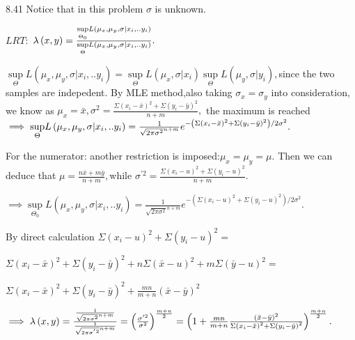 \documentclass{article}
\begin{document}
8.41 Notice that in this problem $\sigma $ is unknown.

$LRT:$ $\lambda \left( x,y\right) =\frac{\underset{\Theta _{0}}{\sup }%
L\left( \mu _{x},\mu _{y},\sigma |x_{i},..y_{i}\right) }{\underset{\Theta }{%
\sup }L\left( \mu _{x},\mu _{y},\sigma |x_{i},..y_{i}\right) }.$

$\underset{\Theta }{\sup }L\left( \mu _{x},\mu _{y},\sigma
|x_{i},..y_{i}\right) =\underset{\Theta }{\sup }L\left( \mu _{x},\sigma
|x_{i}\right) \underset{\Theta }{\sup }L\left( \mu _{y},\sigma |y_{i}\right)
,$since the two samples are indepedent. By MLE method,also taking $\sigma
_{x}=\sigma _{y}$ into consideration, we know as $\mu _{x}=\bar{x},\sigma
^{2}=\frac{\Sigma \left( x_{i}-\bar{x}\right) ^{2}+\Sigma \left( y_{i}-\bar{y%
}\right) ^{2}}{n+m},$ the maximum is reached$\implies \underset{\Theta }{%
\sup }L\left( \mu _{x},\mu _{y},\sigma |x_{i},..y_{i}\right) =\frac{1}{\sqrt{%
2\pi \sigma ^{2}}^{n+m}}e^{-\left( \Sigma \left( x_{i}-\bar{x}\right)
^{2}+\Sigma \left( y_{i}-\bar{y}\right) ^{2}\right) /2\sigma ^{2}}.$

For the numerator: another restriction is imposed:$\mu _{x}=\mu _{y}=\mu .$
Then we can deduce that $\mu =\frac{n\bar{x}+m\bar{y}}{n+m},$while $\sigma
^{\prime 2}=\frac{\Sigma \left( x_{i}-u\right) ^{2}+\Sigma \left(
y_{i}-u\right) ^{2}}{n+m}.$

$\implies \underset{\Theta _{0}}{\sup }L\left( \mu _{x},\mu _{y},\sigma
|x_{i},..y_{i}\right) =\frac{1}{\sqrt{2\pi \sigma ^{2}}^{n+m}}e^{-\left(
\Sigma \left( x_{i}-u\right) ^{2}+\Sigma \left( y_{i}-u\right) ^{2}\right)
/2\sigma ^{2}}.$

By direct calculation $\Sigma \left( x_{i}-u\right) ^{2}+\Sigma \left(
y_{i}-u\right) ^{2}=$

$\Sigma \left( x_{i}-\bar{x}\right) ^{2}+\Sigma \left( y_{i}-\bar{y}\right)
^{2}+n\Sigma \left( \bar{x}-u\right) ^{2}+m\Sigma \left( \bar{y}-u\right)
^{2}=$

$\Sigma \left( x_{i}-\bar{x}\right) ^{2}+\Sigma \left( y_{i}-\bar{y}\right)
^{2}+\frac{mn}{m+n}\left( \bar{x}-\bar{y}\right) ^{2}$

$\implies \lambda \left( x,y\right) =\frac{\frac{1}{\sqrt{2\pi \sigma ^{2}}%
^{n+m}}}{\frac{1}{\sqrt{2\pi \sigma ^{^{\prime }2}}^{n+m}}}=\left( \frac{%
\sigma ^{\prime 2}}{\sigma ^{2}}\right) ^{\frac{m+n}{2}}=\left( 1+\frac{mn}{%
m+n}\frac{\left( \bar{x}-\bar{y}\right) ^{2}}{\Sigma \left( x_{i}-\bar{x}%
\right) ^{2}+\Sigma \left( y_{i}-\bar{y}\right) ^{2}}\right) ^{\frac{m+n}{2}%
}.$
\end{document}
